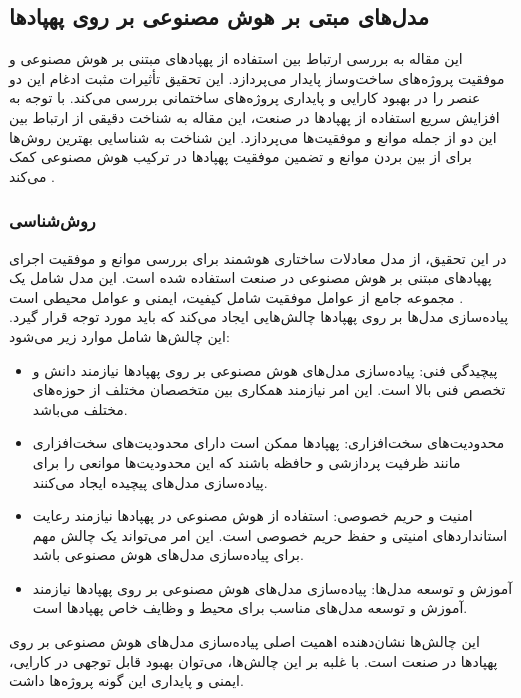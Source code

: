 \subsection {مدل‌های مبتی بر هوش مصنوعی بر روی پهپاد‌ها}

این مقاله به بررسی ارتباط بین استفاده از پهپادهای مبتنی بر هوش مصنوعی و موفقیت پروژه‌های ساخت‌وساز پایدار می‌پردازد. این تحقیق تأثیرات مثبت ادغام
 این دو عنصر را در بهبود کارایی و پایداری پروژه‌های ساختمانی بررسی می‌کند. با توجه به افزایش سریع استفاده از پهپادها در صنعت، این مقاله به شناخت دقیقی از ارتباط بین این دو از جمله موانع و موفقیت‌ها می‌پردازد. این شناخت به شناسایی بهترین روش‌ها برای از بین بردن موانع و تضمین موفقیت پهپادها در ترکیب هوش مصنوعی کمک می‌کند \cite{waqar2023modeling}.


\subsubsection{روش‌شناسی}
در این تحقیق، از مدل معادلات ساختاری هوشمند برای بررسی موانع و موفقیت اجرای پهپادهای مبتنی بر هوش مصنوعی در صنعت استفاده شده است.
این مدل شامل یک مجموعه جامع از عوامل موفقیت شامل کیفیت، ایمنی و عوامل محیطی است .
\\
پیاده‌سازی مدل‌ها بر روی پهپادها چالش‌هایی ایجاد می‌کند که باید مورد توجه قرار گیرد. این چالش‌ها شامل موارد زیر می‌شود:
\begin{itemize}
    \item پیچیدگی فنی: پیاده‌سازی مدل‌های هوش مصنوعی بر روی پهپادها نیازمند دانش و تخصص فنی بالا است. این امر نیازمند همکاری بین متخصصان مختلف از حوزه‌های مختلف می‌باشد.
    \item محدودیت‌های سخت‌افزاری: پهپادها ممکن است دارای محدودیت‌های سخت‌افزاری مانند ظرفیت پردازشی و حافظه باشند که این محدودیت‌ها موانعی را برای پیاده‌سازی مدل‌های پیچیده ایجاد می‌کنند.
    \item امنیت و حریم خصوصی: استفاده از هوش مصنوعی در پهپادها نیازمند رعایت استانداردهای امنیتی و حفظ حریم خصوصی است. این امر می‌تواند یک چالش مهم برای پیاده‌سازی مدل‌های هوش مصنوعی باشد.
    \item آموزش و توسعه مدل‌ها: پیاده‌سازی مدل‌های هوش مصنوعی بر روی پهپادها نیازمند آموزش و توسعه مدل‌های مناسب برای محیط و وظایف خاص پهپادها است.
\end{itemize}
این چالش‌ها نشان‌دهنده اهمیت اصلی پیاده‌سازی مدل‌های هوش مصنوعی بر روی پهپادها در صنعت است. با غلبه بر این چالش‌ها، می‌توان بهبود 
قابل توجهی در کارایی، ایمنی و پایداری این گونه پروژه‌‌ها داشت.

